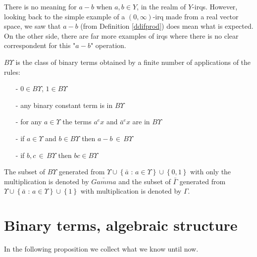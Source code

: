\documentclass{article}
\begin{document}
\vspace{.5cm} 



There is no meaning for $a-b$ when $a, b \in Y$, in the realm of $Y$-irqs. However, looking back to the simple example of a $(0, \infty)$-irq made from a real vector space, we saw that $a-b$ (from Definition 
\ref{ddifprod}) does mean what is expected. On the other side, there are far more examples of irqs where there is no clear correspondent for this "$a-b$" operation. 

\begin{definition}
$B\Upsilon$ is the class of binary terms obtained by a finite number of applications of the rules: 
\begin{enumerate}
\item[-] $0 \in B\Upsilon$, $1 \in B\Upsilon$
\item[-] any binary constant term is in $B\Upsilon$
\item[-] for any $a \in \Upsilon$ the terms $a^{e} x$ and $\bar{a}^{e} x$ are in $B\Upsilon$
\item[-] if $a \in \Upsilon$ and $b \in B\Upsilon$ then $a-b \, \in \, B\Upsilon$
\item[-] if $b, c \, \in \,  B\Upsilon$ then $bc \in B\Upsilon$
\end{enumerate}
The subset of $B\Upsilon$ generated from $\displaystyle \Upsilon \cup \left\{ \bar{a} \mbox{ : } a \in \Upsilon \right\} \cup \left\{ 0, 1 \right\}$ with only the multiplication is denoted by $\displaystyle \bar{Gamma}$ and the subset of $\bar{\Gamma}$ generated from $\displaystyle \Upsilon \cup \left\{ \bar{a} \mbox{ : } a \in \Upsilon \right\} \cup \left\{ 1 \right\}$ with multiplication is denoted by $\Gamma$. 
\end{definition}


\section{Binary terms, algebraic structure}

In the following proposition we collect what we know until now. 
\end{document}

